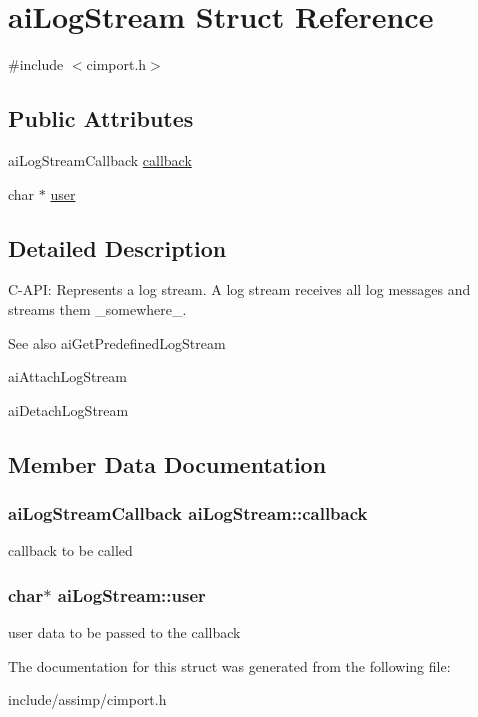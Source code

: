 \hypertarget{structaiLogStream}{\section{ai\-Log\-Stream \-Struct \-Reference}
\label{structaiLogStream}
}


{\ttfamily \#include $<$cimport.\-h$>$}

\subsection*{\-Public \-Attributes}
\begin{DoxyCompactItemize}
\item 
ai\-Log\-Stream\-Callback \hyperlink{structaiLogStream_ac73ae46eee54ba0f920d6abb97c33e97}{callback}
\item 
char $\ast$ \hyperlink{structaiLogStream_a3382042e4171a6dd5a71d7f98741f86e}{user}
\end{DoxyCompactItemize}


\subsection{\-Detailed \-Description}
\-C-\/\-A\-P\-I\-: \-Represents a log stream. \-A log stream receives all log messages and streams them \-\_\-somewhere\-\_\-. \begin{DoxySeeAlso}{\-See also}
ai\-Get\-Predefined\-Log\-Stream 

ai\-Attach\-Log\-Stream 

ai\-Detach\-Log\-Stream 
\end{DoxySeeAlso}


\subsection{\-Member \-Data \-Documentation}
\hypertarget{structaiLogStream_ac73ae46eee54ba0f920d6abb97c33e97}{
\subsubsection[{callback}]{\setlength{\rightskip}{0pt plus 5cm}ai\-Log\-Stream\-Callback {\bf ai\-Log\-Stream\-::callback}}}\label{structaiLogStream_ac73ae46eee54ba0f920d6abb97c33e97}
callback to be called \hypertarget{structaiLogStream_a3382042e4171a6dd5a71d7f98741f86e}{
\subsubsection[{user}]{\setlength{\rightskip}{0pt plus 5cm}char$\ast$ {\bf ai\-Log\-Stream\-::user}}}\label{structaiLogStream_a3382042e4171a6dd5a71d7f98741f86e}
user data to be passed to the callback 

\-The documentation for this struct was generated from the following file\-:\begin{DoxyCompactItemize}
\item 
include/assimp/cimport.\-h\end{DoxyCompactItemize}
